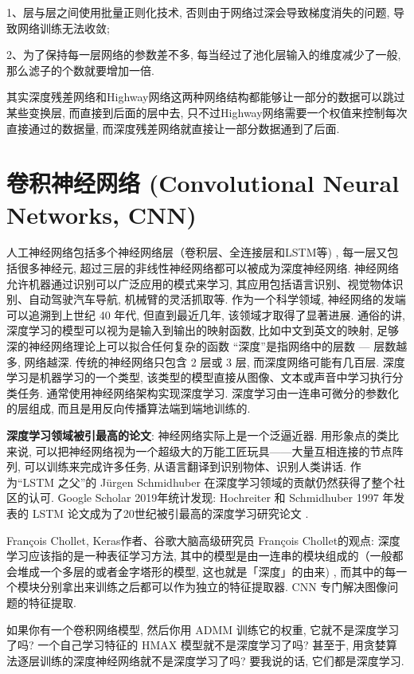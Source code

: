 1、层与层之间使用批量正则化技术, 否则由于网络过深会导致梯度消失的问题, 导致网络训练无法收敛;

2、为了保持每一层网络的参数差不多, 每当经过了池化层输入的维度减少了一般, 那么滤子的个数就要增加一倍.

其实深度残差网络和Highway网络这两种网络结构都能够让一部分的数据可以跳过某些变换层, 而直接到后面的层中去, 只不过Highway网络需要一个权值来控制每次直接通过的数据量, 而深度残差网络就直接让一部分数据通到了后面.
\section{卷积神经网络 (Convolutional Neural Networks, CNN)}
人工神经网络包括多个神经网络层（卷积层、全连接层和LSTM等) , 每一层又包括很多神经元, 超过三层的非线性神经网络都可以被成为深度神经网络.
神经网络允许机器通过识别可以广泛应用的模式来学习, 其应用包括语言识别、视觉物体识别、自动驾驶汽车导航, 机械臂的灵活抓取等. 
作为一个科学领域, 神经网络的发端可以追溯到上世纪 40 年代, 但直到最近几年, 该领域才取得了显著进展.
通俗的讲, 深度学习的模型可以视为是输入到输出的映射函数, 比如中文到英文的映射, 足够深的神经网络理论上可以拟合任何复杂的函数
“深度”是指网络中的层数 — 层数越多, 网络越深. 传统的神经网络只包含 2 层或 3 层, 而深度网络可能有几百层.
深度学习是机器学习的一个类型, 该类型的模型直接从图像、文本或声音中学习执行分类任务. 通常使用神经网络架构实现深度学习.
深度学习由一连串可微分的参数化的层组成, 而且是用反向传播算法端到端地训练的.
\begin{remark}
\textbf{深度学习领域被引最高的论文}:
神经网络实际上是一个泛逼近器. 用形象点的类比来说, 可以把神经网络视为一个超级大的万能工匠玩具——大量互相连接的节点阵列, 可以训练来完成许多任务, 从语言翻译到识别物体、识别人类讲话.
作为“LSTM 之父”的 Jürgen Schmidhuber 在深度学习领域的贡献仍然获得了整个社区的认可.
Google Scholar 2019年统计发现:  Hochreiter 和 Schmidhuber 1997 年发表的 LSTM 论文成为了20世纪被引最高的深度学习研究论文 \cite{HochreiterNC1997}.
\end{remark}

François Chollet, Keras作者、谷歌大脑高级研究员 François Chollet的观点: 深度学习应该指的是一种表征学习方法, 其中的模型是由一连串的模块组成的（一般都会堆成一个多层的或者金字塔形的模型, 这也就是「深度」的由来) , 而其中的每一个模块分别拿出来训练之后都可以作为独立的特征提取器. CNN 专门解决图像问题的特征提取.
\begin{example}
  如果你有一个卷积网络模型, 然后你用 ADMM 训练它的权重, 它就不是深度学习了吗? 一个自己学习特征的 HMAX 模型就不是深度学习了吗? 甚至于, 用贪婪算法逐层训练的深度神经网络就不是深度学习了吗? 要我说的话, 它们都是深度学习.
\end{example}

